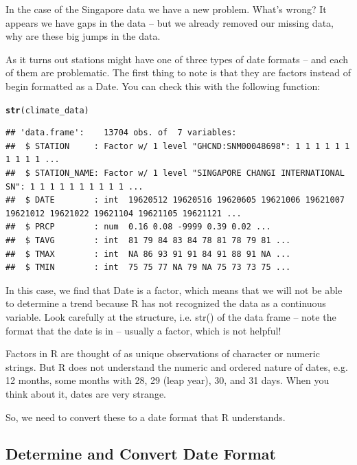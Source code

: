 \documentclass{article}\usepackage[]{graphicx}\usepackage[]{color}
\makeatletter
\newcommand{\hlstd}[1]{\textcolor[rgb]{0.345,0.345,0.345}{#1}}%
\newcommand{\hlkwd}[1]{\textcolor[rgb]{0.737,0.353,0.396}{\textbf{#1}}}%
\newenvironment{kframe}{%
 \def\at@end@of@kframe{}%
 \ifinner\ifhmode%
  \def\at@end@of@kframe{\end{minipage}}%
  \begin{minipage}{\columnwidth}%
 \fi\fi%
 \def\FrameCommand##1{\hskip\@totalleftmargin \hskip-\fboxsep
 \colorbox{shadecolor}{##1}\hskip-\fboxsep
     \hskip-\linewidth \hskip-\@totalleftmargin \hskip\columnwidth}%
 \MakeFramed {\advance\hsize-\width
   \@totalleftmargin\z@ \linewidth\hsize
   \@setminipage}}%
 {\par\unskip\endMakeFramed%
 \at@end@of@kframe}
\newenvironment{knitrout}{}{} %
\makeatother
\begin{document}
In the case of the Singapore data we have a new problem. What's wrong? It appears we have gaps in the data -- but we already removed our missing data, why are these big jumps in the data.

As it turns out stations might have one of three types of date formats -- and each of them are problematic. The first thing to note is that they are factors instead of begin formatted as a Date. You can check this with the following function:

\begin{knitrout}
\color{fgcolor}\begin{kframe}
\begin{alltt}
\hlkwd{str}\hlstd{(climate_data)}
\end{alltt}
\begin{verbatim}
## 'data.frame':	13704 obs. of  7 variables:
##  $ STATION     : Factor w/ 1 level "GHCND:SNM00048698": 1 1 1 1 1 1 1 1 1 1 ...
##  $ STATION_NAME: Factor w/ 1 level "SINGAPORE CHANGI INTERNATIONAL SN": 1 1 1 1 1 1 1 1 1 1 ...
##  $ DATE        : int  19620512 19620516 19620605 19621006 19621007 19621012 19621022 19621104 19621105 19621121 ...
##  $ PRCP        : num  0.16 0.08 -9999 0.39 0.02 ...
##  $ TAVG        : int  81 79 84 83 84 78 81 78 79 81 ...
##  $ TMAX        : int  NA 86 93 91 91 84 91 88 91 NA ...
##  $ TMIN        : int  75 75 77 NA 79 NA 75 73 73 75 ...
\end{verbatim}
\end{kframe}
\end{knitrout}

In this case, we find that Date is a factor, which means that we will not be able to determine a trend because R has not recognized the data as a continuous variable. Look carefully at the structure, i.e. str() of the data frame -- note the format that the date is in -- usually a factor, which is not helpful!  

Factors in R are thought of as unique observations of character or numeric strings. But R does not understand the numeric and ordered nature of dates, e.g. 12 months, some months with 28, 29 (leap year), 30, and 31 days. When you think about it, dates are very strange. 

So, we need to convert these to a date format that R understands. 


\subsection{Determine and Convert Date Format}
\end{document}
